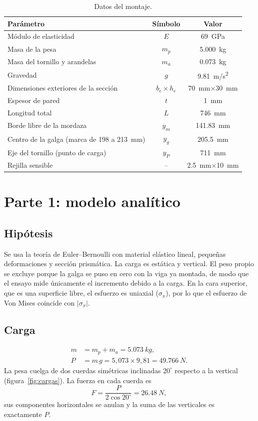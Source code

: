 \documentclass[11pt,a4paper]{article}
\begin{document}
\begin{table}[H]
\centering
\caption{Datos del montaje.}
\begin{tabular}{@{}lcc@{}}
\toprule
Par\'ametro & S\'imbolo & Valor \\
\midrule
M\'odulo de elasticidad & $E$ & \SI{69}{GPa} \\
Masa de la pesa & $m_p$ & \SI{5,000}{kg} \\
Masa del tornillo y arandelas & $m_a$ & \SI{0,073}{kg} \\
Gravedad & $g$ & \SI{9,81}{m/s^2} \\
Dimensiones exteriores de la secci\'on & $b_e\times h_e$ & \SI{70}{mm}$\times$\SI{30}{mm} \\
Espesor de pared & $t$ & \SI{1}{mm} \\
Longitud total & $L$ & \SI{746}{mm} \\
Borde libre de la mordaza & $y_m$ & \SI{141,83}{mm} \\
Centro de la galga (marca de 198 a \SI{213}{mm}) & $y_g$ & \SI{205,5}{mm} \\
Eje del tornillo (punto de carga) & $y_P$ & \SI{711}{mm} \\
Rejilla sensible & -- & \SI{2,5}{mm}$\times$\SI{10}{mm} \\
\bottomrule
\end{tabular}
\end{table}

\section{Parte 1: modelo anal\'itico}
\subsection{Hip\'otesis}
Se usa la teor\'ia de Euler--Bernoulli con material el\'astico lineal, peque\~nas deformaciones y secci\'on prism\'atica. La carga es est\'atica y vertical. El peso propio se excluye porque la galga se puso en cero con la viga ya montada, de modo que el ensayo mide \'unicamente el incremento debido a la carga. En la cara superior, que es una superficie libre, el esfuerzo es uniaxial ($\sigma_x$), por lo que el esfuerzo de Von Mises coincide con $|\sigma_x|$.

\subsection{Carga}
\begin{align}
m &= m_p + m_a = \SI{5,073}{kg},\\
P &= m\,g = 5{,}073\times 9{,}81 = \SI{49,766}{N}.
\end{align}
La pesa cuelga de dos cuerdas sim\'etricas inclinadas $20^\circ$ respecto a la vertical (figura~\ref{fig:cargas}). La fuerza en cada cuerda es
\begin{equation}
F=\frac{P}{2\cos 20^\circ}=\SI{26,48}{N},
\end{equation}
sus componentes horizontales se anulan y la suma de las verticales es exactamente $P$.
\end{document}
